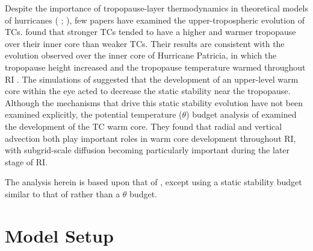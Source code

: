 \documentclass{ametsoc}
\begin{document}
Despite the importance of tropopause-layer thermodynamics in theoretical models of hurricanes (\citeauthor{EmanuelRotunno2011} \citeyear{EmanuelRotunno2011}; \citeauthor{Emanuel2012} \citeyear{Emanuel2012}), few papers have examined the upper-tropospheric evolution of TCs.
\cite{KomaromiDoyle2017} found that stronger TCs tended to have a higher and warmer tropopause over their inner core than weaker TCs.
Their results are consistent with the evolution observed over the inner core of Hurricane Patricia, in which the tropopause height increased and the tropopause temperature warmed throughout RI \citep{DuranMolinari2018}.
The simulations of \cite{OhnoSatoh2015} suggested that the development of an upper-level warm core within the eye acted to decrease the static stability near the tropopause.
Although the mechanisms that drive this static stability evolution have not been examined explicitly, the potential temperature ($\theta$) budget analysis of \cite{SternZhang2013} examined the development of the TC warm core.
They found that radial and vertical advection both play important roles in warm core development throughout RI, with subgrid-scale diffusion becoming particularly important during the later stage of RI.

The analysis herein is based upon that of \cite{SternZhang2013}, except using a static stability budget similar to that of \cite{Kepertetal2016} rather than a $\theta$ budget.

 \section{Model Setup}
\end{document}
